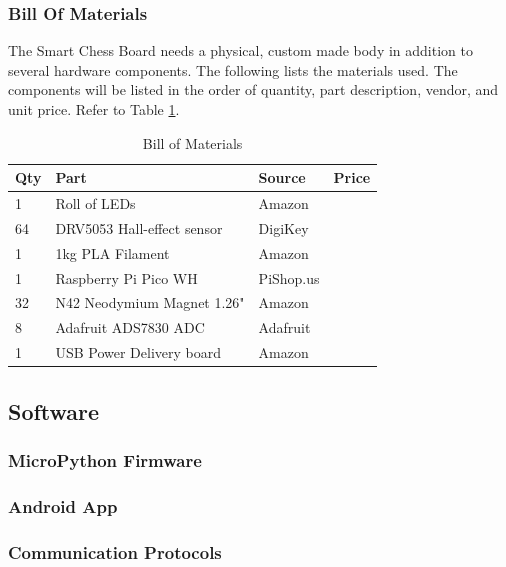 \documentclass[11pt,journal]{IEEEtran}
\begin{document}
\subsubsection{Bill Of Materials}
The Smart Chess Board needs a physical, custom made body in addition to several hardware components. The following lists the materials used. The components will be listed in the order of quantity, part description, vendor, and unit price. Refer to Table \ref{bomtable}.
\begin{center}
\begin{table}[ht]
\caption{Bill of Materials}
\begin{tabular}{|l|l|l|l|}
\hline
\textbf{Qty} & \textbf{Part}                        & \textbf{Source} & \textbf{Price}          \\ \hline
1            & Roll of LEDs                         & Amazon          &                         \\ \hline
64           & DRV5053 Hall-effect  sensor          & DigiKey         &                         \\ \hline
1            & 1kg PLA Filament                     & Amazon          &                         \\ \hline
1            & Raspberry Pi Pico WH                 & PiShop.us       &                         \\ \hline
32           & N42 Neodymium Magnet 1.26"           & Amazon          &                         \\ \hline
8            & Adafruit ADS7830 ADC                 & Adafruit        &                         \\ \hline
1            & USB Power Delivery board             & Amazon          &                         \\ \hline
\end{tabular}
\label{bomtable}
\end{table}
\end{center}
\subsection{Software}
\subsubsection{MicroPython Firmware}
\subsubsection{Android App}
\subsubsection{Communication Protocols}
\end{document}
